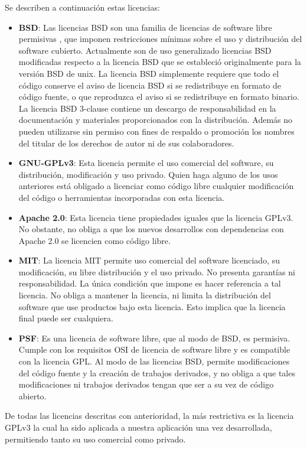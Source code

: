 Se describen a continuación estas licencias:

\begin{itemize}
\item \textbf{BSD}: Las licencias BSD son una familia de licencias de software libre permisivas , que imponen restricciones mínimas sobre el uso y distribución del software cubierto. Actualmente son de uso generalizado licencias BSD modificadas respecto a la licencia BSD que se estableció originalmente para la versión BSD de unix. La licencia BSD simplemente requiere que todo el código conserve el aviso de licencia BSD si se redistribuye en formato de código fuente, o que reproduzca el aviso si se redistribuye en formato binario. La licencia BSD 3-clause contiene un descargo de responsabilidad en la documentación y materiales proporcionados con la distribución. Además no pueden utilizarse sin permiso con fines de respaldo o promoción los nombres del titular de los derechos de autor ni de sus colaboradores.

\item \textbf{GNU-GPLv3}:  Esta licencia permite el uso comercial del software, su distribución, modificación y uso privado. Quien haga alguno de los usos anteriores está obligado a licenciar como código libre cualquier modificación del código o herramientas incorporadas con esta licencia.

\item \textbf{Apache 2.0}: Esta licencia tiene propiedades iguales que la licencia GPLv3. No obstante, no obliga a que los nuevos desarrollos con dependencias con Apache 2.0 se licencien como código libre.

\item \textbf{MIT}: La licencia MIT permite uso comercial del software licenciado, su modificación, su libre distribución y el uso privado. No presenta garantías ni responsabilidad. La única condición que impone es hacer referencia a tal licencia. No obliga a mantener la licencia, ni limita la distribución del software que use productos bajo esta licencia. Esto implica que la licencia final puede ser cualquiera.

\item \textbf{PSF}: Es una licencia de software libre, que al modo de BSD, es permisiva. Cumple con los requisitos OSI de licencia de software libre y es compatible con la licencia GPL. Al modo de las licencias BSD, permite modificaciones del código fuente y la creación de trabajos derivados, y no obliga a que tales modificaciones ni trabajos derivados tengan que ser a su vez de código abierto.
\end{itemize}

De todas las licencias descritas con anterioridad, la más restrictiva es la licencia GPLv3 la cual
ha sido aplicada a nuestra aplicación una vez desarrollada, permitiendo tanto su uso comercial como privado.

